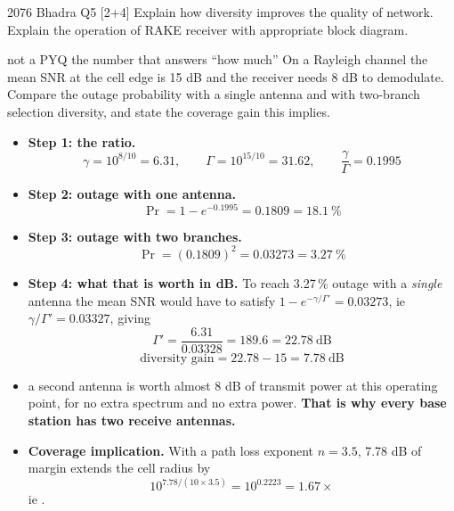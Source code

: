 \begin{asked}{2076 Bhadra \textperiodcentered{} Q5 \textperiodcentered{} [2+4]}
Explain how diversity improves the quality of network. Explain the operation of RAKE receiver
with appropriate block diagram.
\end{asked}
\begin{asked}[PROBLEM]{not a PYQ \textperiodcentered{} the number that answers ``how much'' \added}
On a Rayleigh channel the mean SNR at the cell edge is 15 dB and the receiver needs 8 dB to
demodulate. Compare the outage probability with a single antenna and with two-branch selection
diversity, and state the coverage gain this implies.
\end{asked}

\begin{itemize}
  \item \textbf{Step 1: the ratio.}
        \[ \gamma = 10^{8/10} = 6.31, \qquad \Gamma = 10^{15/10} = 31.62,
           \qquad \frac{\gamma}{\Gamma} = 0.1995 \]
  \item \textbf{Step 2: outage with one antenna.}
        \[ \Pr = 1 - e^{-0.1995} = 0.1809 = \boxed{18.1\ \%} \]
  \item \textbf{Step 3: outage with two branches.}
        \[ \Pr = (0.1809)^2 = 0.03273 = \boxed{3.27\ \%} \]
  \item \textbf{Step 4: what that is worth in dB.}
        To reach 3.27\,\% outage with a \emph{single} antenna the mean SNR would have to satisfy
        $1 - e^{-\gamma/\Gamma'} = 0.03273$, ie $\gamma/\Gamma' = 0.03327$, giving
        \[ \Gamma' = \frac{6.31}{0.03328} = 189.6 = 22.78\ \text{dB} \]
        \[ \text{diversity gain} = 22.78 - 15 = \boxed{7.78\ \text{dB}} \]
  \item {} a second antenna is worth almost 8 dB of transmit power at this
        operating point, for no extra spectrum and no extra power.
        \textbf{That is why every base station has two receive antennas.}
  \item \textbf{Coverage implication.} With a path loss exponent $n = 3.5$, 7.78 dB of margin
        extends the cell radius by
        \[ 10^{7.78/(10 \times 3.5)} = 10^{0.2223} = 1.67\times \]
        ie .
\end{itemize}

